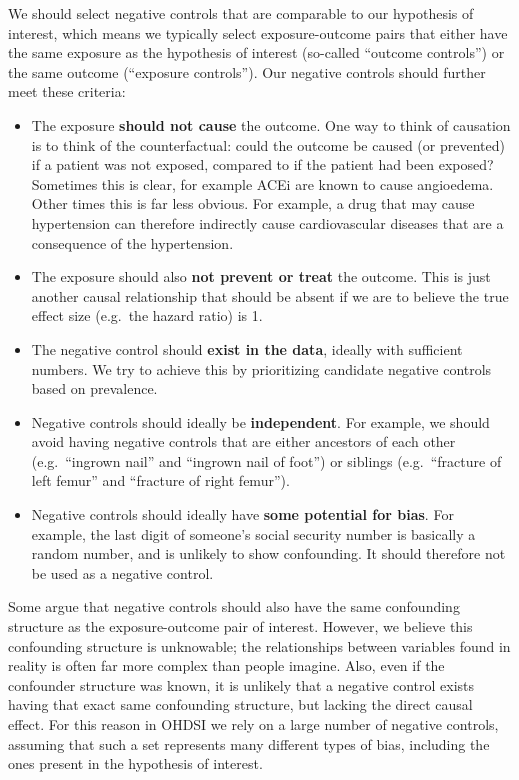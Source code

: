\documentclass[11pt]{book}
\providecommand{\tightlist}{%
  \setlength{\itemsep}{0pt}\setlength{\parskip}{0pt}}
\theoremstyle{definition}
\theoremstyle{definition}
\theoremstyle{definition}
\theoremstyle{remark}
\begin{document}
We should select negative controls that are comparable to our hypothesis of interest, which means we typically select exposure-outcome pairs that either have the same exposure as the hypothesis of interest (so-called ``outcome controls'') or the same outcome (``exposure controls''). Our negative controls should further meet these criteria:

\begin{itemize}
\tightlist
\item
  The exposure \textbf{should not cause} the outcome. One way to think of causation is to think of the counterfactual: could the outcome be caused (or prevented) if a patient was not exposed, compared to if the patient had been exposed? Sometimes this is clear, for example ACEi are known to cause angioedema. Other times this is far less obvious. For example, a drug that may cause hypertension can therefore indirectly cause cardiovascular diseases that are a consequence of the hypertension.
\item
  The exposure should also \textbf{not prevent or treat} the outcome. This is just another causal relationship that should be absent if we are to believe the true effect size (e.g.~the hazard ratio) is 1.
\item
  The negative control should \textbf{exist in the data}, ideally with sufficient numbers. We try to achieve this by prioritizing candidate negative controls based on prevalence.
\item
  Negative controls should ideally be \textbf{independent}. For example, we should avoid having negative controls that are either ancestors of each other (e.g.~``ingrown nail'' and ``ingrown nail of foot'') or siblings (e.g.~``fracture of left femur'' and ``fracture of right femur'').
\item
  Negative controls should ideally have \textbf{some potential for bias}. For example, the last digit of someone's social security number is basically a random number, and is unlikely to show confounding. It should therefore not be used as a negative control.
\end{itemize}

Some argue that negative controls should also have the same confounding structure as the exposure-outcome pair of interest. \citep{lipsitch_2010} However, we believe this confounding structure is unknowable; the relationships between variables found in reality is often far more complex than people imagine. Also, even if the confounder structure was known, it is unlikely that a negative control exists having that exact same confounding structure, but lacking the direct causal effect. For this reason in OHDSI we rely on a large number of negative controls, assuming that such a set represents many different types of bias, including the ones present in the hypothesis of interest.
\end{document}
